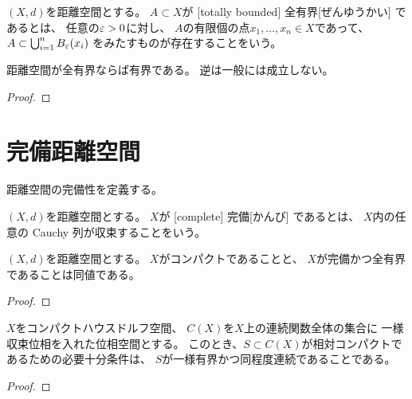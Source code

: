 \documentclass[report]{jlreq}
\begin{document}
\begin{definition}[全有界]
    $(X, d)$を距離空間とする。
    $A \subset X$が
    [totally bounded]
        {全有界}[ぜんゆうかい]
    であるとは、
    任意の$\varepsilon > 0$に対し、
    $A$の有限個の点$x_1, \ldots, x_n \in X$であって、
    $A \subset \bigcup_{i = 1}^n B_\varepsilon (x_i)$
    をみたすものが存在することをいう。
\end{definition}

\begin{proposition}[全有界ならば有界]
    距離空間が全有界ならば有界である。
    逆は一般には成立しない。
\end{proposition}

\begin{proof}
    \TODO{}
\end{proof}

%
\section{完備距離空間}

距離空間の完備性を定義する。

\begin{definition}[完備]
    $(X, d)$を距離空間とする。
    $X$が
    [complete]
        {完備}[かんび]
    であるとは、
    $X$内の任意の Cauchy 列が収束することをいう。
\end{definition}

\begin{theorem}[コンパクト空間の特徴づけ]
    $(X, d)$を距離空間とする。
    $X$がコンパクトであることと、
    $X$が完備かつ全有界であることは同値である。
\end{theorem}

\begin{proof}
    \TODO{}
\end{proof}

\begin{theorem}
    $X$をコンパクトハウスドルフ空間、
    $C(X)$を$X$上の連続関数全体の集合に
    一様収束位相を入れた位相空間とする。
    このとき、$S \subset C(X)$が相対コンパクトであるための必要十分条件は、
    $S$が一様有界かつ同程度連続であることである。
\end{theorem}

\begin{proof}
    \TODO{}
\end{proof}
\end{document}
